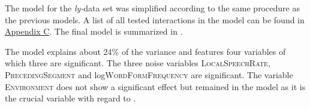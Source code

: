 The model for the \textit{ly-}data set was simplified according to the same procedure as the  previous models. A list of all tested interactions in the model can be found in \hyperref[Appendix C: Summaries of tested interactions in corpus study]{Appendix C}. 
The final model is summarized in .


\begin{table}
	\caption{Summary of linear model for variables predicting the  duration of [l] in -suffixed words}
	\label{tbl: corpus summary model ly}
	
	
\end{table}





The model explains about 24\% of the variance and features four variables of which three are significant. The three noise variables \textsc{LocalSpeechRate}, \textsc{PrecedingSegment} and log\textsc{WordFormFrequency} are significant. 
The variable \textsc{Environment} does not show a significant effect but remained in the model as it is the crucial variable with regard to .




